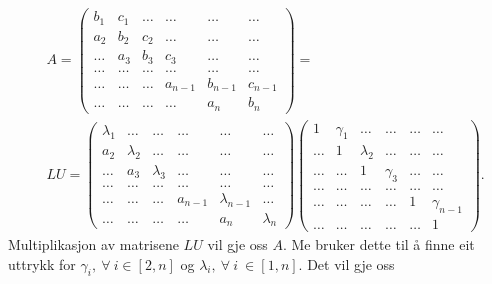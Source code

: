 \documentclass[11pt, a4paper]{article}
\begin{document}
    \begin{equation*}
      \begin{align}
        &A =
        \begin{pmatrix}
          b_1 & c_1 & \dots & \dots & \dots & \dots \\
          a_2 & b_2 & c_2 & \dots & \dots & \dots \\
          \dots & a_3 & b_3 & c_3 & \dots & \dots \\
          \dots & \dots & \dots & \dots & \dots & \dots \\
          \dots & \dots & \dots & a_{n-1} & b_{n-1} & c_{n-1} \\
          \dots & \dots & \dots & \dots & a_n & b_n
        \end{pmatrix} = \\
        &LU =
        \begin{pmatrix}
          \lambda_1 & \dots & \dots & \dots & \dots & \dots \\
          a_2 & \lambda_2 & \dots & \dots & \dots & \dots \\
          \dots & a_3 & \lambda_3 & \dots & \dots & \dots \\
          \dots & \dots & \dots & \dots & \dots & \dots \\
          \dots & \dots & \dots & a_{n-1} & \lambda_{n-1} & \dots \\
          \dots & \dots & \dots & \dots & a_n & \lambda_n 
        \end{pmatrix}
        \begin{pmatrix}
          1 & \gamma_1  & \dots & \dots & \dots & \dots \\
          \dots & 1 & \lambda_2 & \dots & \dots & \dots \\
          \dots & \dots & 1 & \gamma_3 & \dots & \dots \\
          \dots & \dots & \dots & \dots & \dots & \dots \\
          \dots & \dots & \dots & \dots & 1 & \gamma_{n-1} \\
          \dots & \dots & \dots & \dots & \dots & 1 
        \end{pmatrix}.
      \end{align}
    \end{equation*}
    Multiplikasjon av matrisene $LU$ vil gje oss $A$. Me bruker dette til å finne eit uttrykk for 
    $\gamma_i, \ \forall \ i \in [2, n]$ og $\lambda_i, \ \forall \ i \ \in [1, n]$. Det vil gje oss
\end{document}
